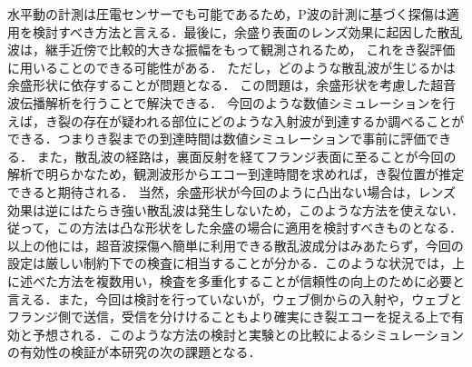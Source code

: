 水平動の計測は圧電センサーでも可能であるため，P波の計測に基づく探傷は適用を検討すべき方法と言える．最後に，余盛り表面のレンズ効果に起因した散乱波は，継手近傍で比較的大きな振幅をもって観測されるため，
これをき裂評価に用いることのできる可能性がある．
ただし，どのような散乱波が生じるかは余盛形状に依存することが問題となる．
この問題は，余盛形状を考慮した超音波伝播解析を行うことで解決できる．
今回のような数値シミュレーションを行えば，き裂の存在が疑われる部位にどのような入射波が到達するか調べることができる．つまりき裂までの到達時間は数値シミュレーションで事前に評価できる．
また，散乱波の経路は，裏面反射を経てフランジ表面に至ることが今回の解析で明らかなため，観測波形からエコー到達時間を求めれば，き裂位置が推定できると期待される．
当然，余盛形状が今回のように凸出ない場合は，レンズ効果は逆にはたらき強い散乱波は発生しないため，このような方法を使えない．従って，この方法は凸な形状をした余盛の場合に適用を検討すべきものとなる．
以上の他には，超音波探傷へ簡単に利用できる散乱波成分はみあたらず，今回の設定は厳しい制約下での検査に相当することが分かる．このような状況では，上に述べた方法を複数用い，検査を多重化することが信頼性の向上のために必要と言える．また，今回は検討を行っていないが，ウェブ側からの入射や，ウェブとフランジ側で送信，受信を分けけることもより確実にき裂エコーを捉える上で有効と予想される．このような方法の検討と実験との比較によるシミュレーションの有効性の検証が本研究の次の課題となる．



